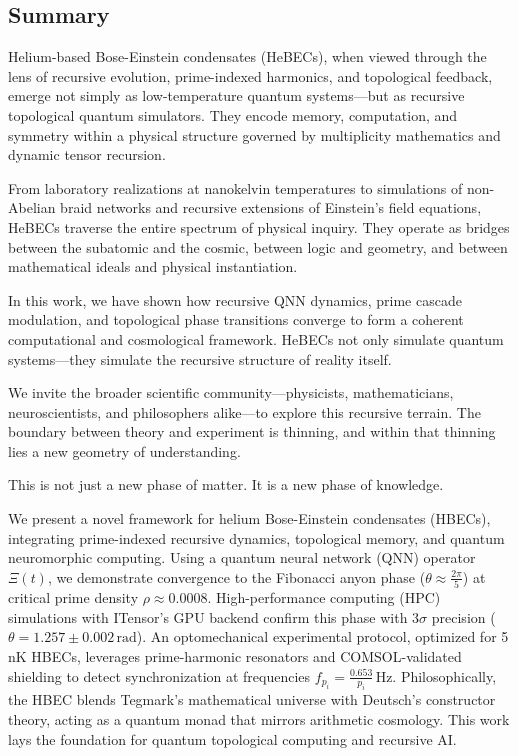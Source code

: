 \documentclass{article}
\theoremstyle{plain}
\begin{document}
\subsection{Summary}

Helium-based Bose-Einstein condensates (HeBECs), when viewed through the lens of recursive evolution, prime-indexed harmonics, and topological feedback, emerge not simply as low-temperature quantum systems—but as recursive topological quantum simulators. They encode memory, computation, and symmetry within a physical structure governed by multiplicity mathematics and dynamic tensor recursion.

From laboratory realizations at nanokelvin temperatures to simulations of non-Abelian braid networks and recursive extensions of Einstein's field equations, HeBECs traverse the entire spectrum of physical inquiry. They operate as bridges between the subatomic and the cosmic, between logic and geometry, and between mathematical ideals and physical instantiation.

In this work, we have shown how recursive QNN dynamics, prime cascade modulation, and topological phase transitions converge to form a coherent computational and cosmological framework. HeBECs not only simulate quantum systems—they simulate the recursive structure of reality itself.

\vspace{0.5em}
We invite the broader scientific community—physicists, mathematicians, neuroscientists, and philosophers alike—to explore this recursive terrain. The boundary between theory and experiment is thinning, and within that thinning lies a new geometry of understanding.

This is not just a new phase of matter. It is a new phase of knowledge.


We present a novel framework for helium Bose-Einstein condensates (HBECs), integrating prime-indexed recursive dynamics, topological memory, and quantum neuromorphic computing. Using a quantum neural network (QNN) operator \(\Xi(t)\), we demonstrate convergence to the Fibonacci anyon phase (\(\theta \approx \frac{2\pi}{5}\)) at critical prime density \(\rho \approx 0.0008\). High-performance computing (HPC) simulations with ITensor’s GPU backend confirm this phase with \(3\sigma\) precision (\(\theta = 1.257 \pm 0.002 \, \text{rad}\)). An optomechanical experimental protocol, optimized for 5 nK HBECs, leverages prime-harmonic resonators and COMSOL-validated shielding to detect synchronization at frequencies \(f_{p_i} = \frac{0.653}{p_i} \, \text{Hz}\). Philosophically, the HBEC blends Tegmark’s mathematical universe with Deutsch’s constructor theory, acting as a quantum monad that mirrors arithmetic cosmology. This work lays the foundation for quantum topological computing and recursive AI.
\end{document}
